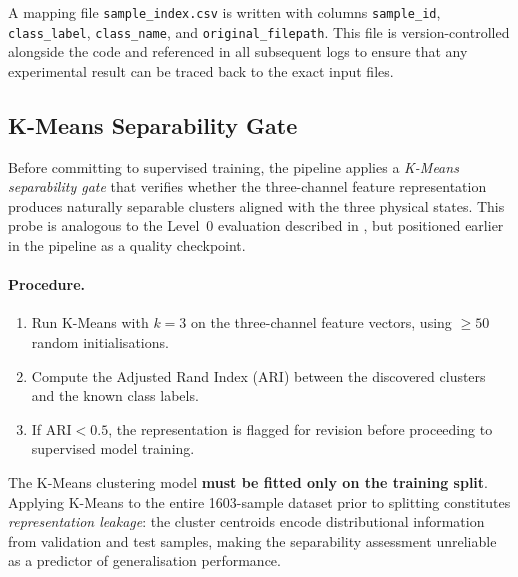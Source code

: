 A mapping file \texttt{sample\_index.csv} is written with columns
\texttt{sample\_id}, \texttt{class\_label}, \texttt{class\_name}, and
\texttt{original\_filepath}.  This file is version-controlled alongside
the code and referenced in all subsequent logs to ensure that any
experimental result can be traced back to the exact input files.

\subsection{K-Means Separability Gate}
\label{sec:preproc:kmeans_gate}

Before committing to supervised training, the pipeline applies a
\emph{K-Means separability gate} that verifies whether the
three-channel feature representation produces naturally separable
clusters aligned with the three physical states.  This probe is
analogous to the Level~0 evaluation described in
, but positioned earlier in the pipeline as a
quality checkpoint.

\paragraph{Procedure.}
\begin{enumerate}
  \item Run K-Means with $k = 3$ on the three-channel feature vectors,
        using $\geq 50$ random initialisations.
  \item Compute the Adjusted Rand Index (ARI) between the discovered
        clusters and the known class labels.
  \item If $\text{ARI} < 0.5$, the representation is flagged for
        revision before proceeding to supervised model training.
\end{enumerate}

\begin{tcolorbox}[
  colback=red!5!white,
  colframe=red!75!black,
  title={\textbf{Anti-Leakage Requirement}},
  fonttitle=\bfseries
]
The K-Means clustering model \textbf{must be fitted only on the
training split}.  Applying K-Means to the entire \num{1603}-sample
dataset prior to splitting constitutes \emph{representation leakage}:
the cluster centroids encode distributional information from
validation and test samples, making the separability assessment
unreliable as a predictor of generalisation performance.
\end{tcolorbox}

